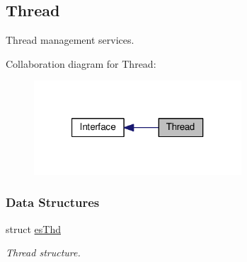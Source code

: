 \hypertarget{group__kern__thd}{\subsection{Thread}
\label{group__kern__thd}
}


Thread management services.  


Collaboration diagram for Thread\-:\nopagebreak
\begin{figure}[H]
\begin{center}
\leavevmode
\includegraphics[width=220pt]{group__kern__thd}
\end{center}
\end{figure}
\subsubsection*{Data Structures}
\begin{DoxyCompactItemize}
\item 
struct \hyperlink{structesThd}{es\-Thd}
\begin{DoxyCompactList}\small\item\em Thread structure. \end{DoxyCompactList}\end{DoxyCompactItemize}
